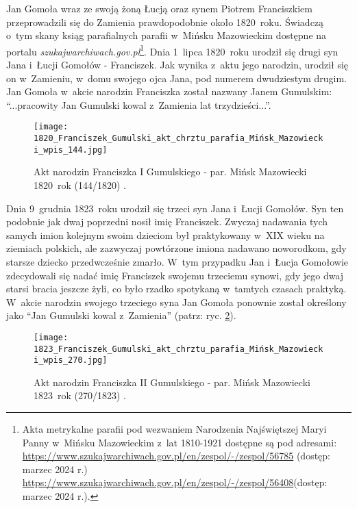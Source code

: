 Jan Gomoła wraz ze swoją żoną Łucją oraz synem Piotrem Franciszkiem 
przeprowadzili się do Zamienia prawdopodobnie około 1820~roku. Świadczą o~tym 
skany ksiąg parafialnych parafii w~Mińsku Mazowieckim dostępne na portalu 
\emph{szukajwarchiwach.gov.pl}\footnote{Akta metrykalne parafii pod wezwaniem 
Narodzenia Najświętszej Maryi Panny w~Mińsku Mazowieckim z~lat 1810-1921 
dostępne są pod adresami: \\
\url{https://www.szukajwarchiwach.gov.pl/en/zespol/-/zespol/56785} (dostęp: 
marzec 2024 r.) \\ 
\url{https://www.szukajwarchiwach.gov.pl/en/zespol/-/zespol/56408}(dostęp: 
marzec 2024 r.).}. Dnia 1~lipca 1820~roku urodził się drugi syn Jana i~Łucji 
Gomołów - Franciszek. Jak wynika z~aktu jego narodzin, urodził się on 
w~Zamieniu, w~domu swojego ojca Jana, pod numerem dwudziestym drugim. Jan 
Gomoła w~akcie narodzin Franciszka został nazwany Janem Gumulskim: 
\enquote{...pracowity Jan Gumulski kowal z~Zamienia lat trzydzieści...}.

\begin{figure}[!ht]
    \vspace*{0.5cm}
    \centering \texttt{[image: 
        1820\_Franciszek\_Gumulski\_akt\_chrztu\_parafia\_Mińsk\_Mazowiecki\_wpis\_144.jpg]}
    \captionsetup{format=hang}
    \caption{Akt narodzin Franciszka I Gumulskiego - par. Mińsk Mazowiecki 
    1820~rok (144/1820) \cite{par_minsk1}.}
    \label{fig:fgumulski_1820}
\end{figure}

Dnia 9~grudnia 1823~roku urodził się trzeci syn Jana i~Łucji Gomołów. Syn ten 
podobnie jak dwaj poprzedni nosił imię Franciszek. Zwyczaj nadawania tych 
samych imion kolejnym swoim dzieciom był praktykowany w~XIX wieku na ziemiach 
polskich, ale zazwyczaj powtórzone imiona nadawano noworodkom, gdy starsze 
dziecko przedwcześnie zmarło. W~tym przypadku Jan i~Łucja Gomołowie 
zdecydowali się nadać imię Franciszek swojemu trzeciemu synowi, gdy jego dwaj 
starsi bracia jeszcze żyli, co było rzadko spotykaną w~tamtych czasach 
praktyką. W~akcie narodzin swojego trzeciego syna Jan Gomoła ponownie został 
określony jako \enquote{Jan Gumulski kowal z~Zamienia} (patrz: ryc. 
\ref{fig:fgumulski_1823}).

\begin{figure}[!ht]
    \vspace*{0.5cm}
    \centering \texttt{[image: 
        1823\_Franciszek\_Gumulski\_akt\_chrztu\_parafia\_Mińsk\_Mazowiecki\_wpis\_270.jpg]}
    \captionsetup{format=hang}
    \caption{Akt narodzin Franciszka II Gumulskiego - par. Mińsk Mazowiecki 
    1823~rok (270/1823) \cite{par_minsk1}.}
    \label{fig:fgumulski_1823}
\end{figure}

